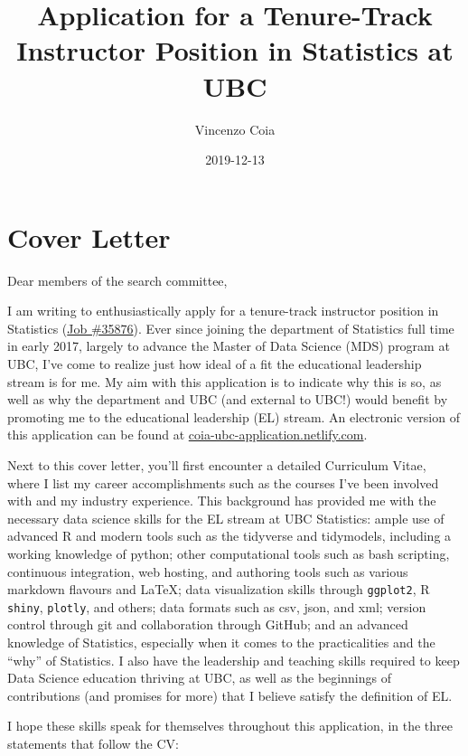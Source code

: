 \documentclass[]{article}
\title{Application for a Tenure-Track Instructor Position in Statistics at UBC}
\author{Vincenzo Coia}
\date{2019-12-13}
\begin{document}
\maketitle

{
\hypersetup{linkcolor=black}
\setcounter{tocdepth}{2}
\tableofcontents
}
\hypertarget{cover-letter}{%
\section{Cover Letter}\label{cover-letter}}

Dear members of the search committee,

I am writing to enthusiastically apply for a tenure-track instructor position in Statistics (\href{https://www.stat.ubc.ca/three-tenure-track-instructor-positions-statistics-35876}{Job \#35876}). Ever since joining the department of Statistics full time in early 2017, largely to advance the Master of Data Science (MDS) program at UBC, I've come to realize just how ideal of a fit the educational leadership stream is for me. My aim with this application is to indicate why this is so, as well as why the department and UBC (and external to UBC!) would benefit by promoting me to the educational leadership (EL) stream. An electronic version of this application can be found at \href{https://coia-ubc-application.netlify.com/}{coia-ubc-application.netlify.com}.

Next to this cover letter, you'll first encounter a detailed Curriculum Vitae, where I list my career accomplishments such as the courses I've been involved with and my industry experience. This background has provided me with the necessary data science skills for the EL stream at UBC Statistics: ample use of advanced R and modern tools such as the tidyverse and tidymodels, including a working knowledge of python; other computational tools such as bash scripting, continuous integration, web hosting, and authoring tools such as various markdown flavours and LaTeX; data visualization skills through \texttt{ggplot2}, R \texttt{shiny}, \texttt{plotly}, and others; data formats such as csv, json, and xml; version control through git and collaboration through GitHub; and an advanced knowledge of Statistics, especially when it comes to the practicalities and the ``why'' of Statistics. I also have the leadership and teaching skills required to keep Data Science education thriving at UBC, as well as the beginnings of contributions (and promises for more) that I believe satisfy the definition of EL.

I hope these skills speak for themselves throughout this application, in the three statements that follow the CV:
\end{document}
